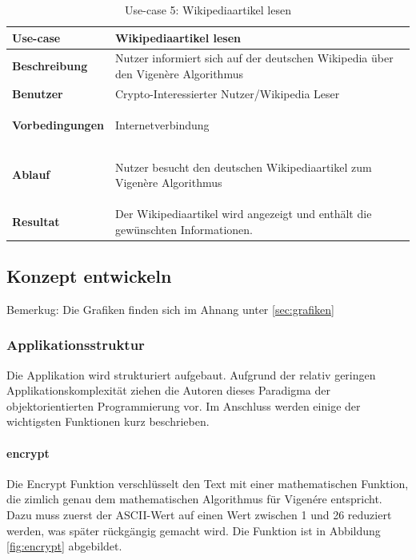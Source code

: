 \documentclass[11pt,paper=a4,final]{scrartcl}
\begin{document}
\begin{table}[h!]
  \centering
  \begin{tabular}{|l|p{12cm}|}\hline
    \bf Use-case & \bf Wikipediaartikel lesen \\ \hline
    \bf Beschreibung & Nutzer informiert sich auf der deutschen Wikipedia \"uber
    den Vigen\`ere Algorithmus \\ \hline
    \bf Benutzer & Crypto-Interessierter Nutzer/Wikipedia Leser \\ \hline
    \bf Vorbedingungen & \begin{itemize*} \item Internetverbindung
    \end{itemize*} \\ \hline
    \bf Ablauf & \begin{itemize*}\item Nutzer besucht den deutschen
    Wikipediaartikel zum Vigen\`ere Algorithmus \end{itemize*} \\ \hline
    \bf Resultat & Der Wikipediaartikel wird angezeigt und enth\"alt die
    gew\"unschten Informationen. \\ \hline
  \end{tabular}
  \caption{Use-case 5: Wikipediaartikel lesen}
  \label{tab:usecase5}
\end{table}
\subsection{Konzept entwickeln}
Bemerkug: Die Grafiken finden sich im Ahnang unter \glqq \ref{sec:grafiken}
\grqq
\subsubsection{Applikationsstruktur}
Die Applikation wird strukturiert aufgebaut. Aufgrund der relativ geringen
Applikationskomplexit\"at ziehen die Autoren dieses Paradigma der
objektorientierten Programmierung vor. Im Anschluss werden einige der
wichtigsten Funktionen kurz beschrieben.
\paragraph{encrypt}
Die Encrypt Funktion verschl\"usselt den Text mit einer mathematischen Funktion,
die zimlich genau dem mathematischen Algorithmus f\"ur Vigen\'ere entspricht.
Dazu muss zuerst der ASCII-Wert auf einen Wert zwischen 1 und 26 reduziert
werden, was sp\"ater r\"uckg\"angig gemacht wird. Die Funktion ist in
Abbildung \ref{fig:encrypt} \glqq {}\grqq abgebildet.
\end{document}
